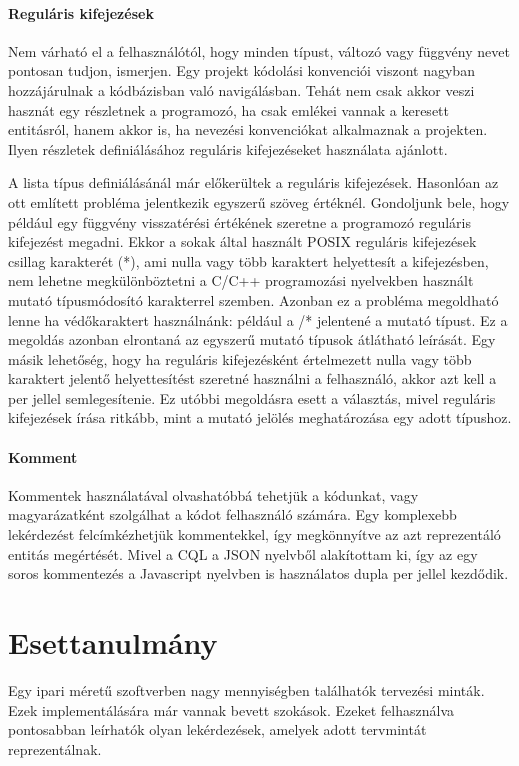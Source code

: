 \documentclass[a4paper,12pt]{report}
\begin{document}
\subsubsection{Reguláris kifejezések}
Nem várható el a felhasználótól, hogy minden típust, változó vagy függvény nevet pontosan tudjon, ismerjen. Egy projekt kódolási konvenciói viszont nagyban hozzájárulnak a kódbázisban való navigálásban. Tehát nem csak akkor veszi hasznát egy részletnek a programozó, ha csak emlékei vannak a keresett entitásról, hanem akkor is, ha nevezési konvenciókat alkalmaznak a projekten. Ilyen részletek definiálásához reguláris kifejezéseket használata ajánlott.
\par A lista típus definiálásánál már előkerültek a reguláris kifejezések. Hasonlóan az ott említett probléma jelentkezik egyszerű szöveg értéknél. Gondoljunk bele, hogy például egy függvény visszatérési értékének szeretne a programozó reguláris kifejezést megadni. Ekkor a sokak által használt POSIX reguláris kifejezések csillag karakterét (*), ami nulla vagy több karaktert helyettesít a kifejezésben, nem lehetne megkülönböztetni a C/C++ programozási nyelvekben használt mutató típusmódosító karakterrel szemben. Azonban ez a probléma megoldható lenne ha védőkaraktert használnánk: például a /* jelentené a mutató típust. Ez a megoldás azonban elrontaná az egyszerű mutató típusok átlátható leírását. Egy másik lehetőség, hogy ha reguláris kifejezésként értelmezett nulla vagy több karaktert jelentő helyettesítést szeretné használni a felhasználó, akkor azt kell a per jellel semlegesítenie. Ez utóbbi megoldásra esett a választás, mivel reguláris kifejezések írása ritkább, mint a mutató jelölés meghatározása egy adott típushoz.
\subsubsection{Komment}
Kommentek használatával olvashatóbbá tehetjük a kódunkat, vagy magyarázatként szolgálhat a kódot felhasználó számára. Egy komplexebb lekérdezést felcímkézhetjük kommentekkel, így megkönnyítve az azt reprezentáló entitás megértését. Mivel a CQL a JSON nyelvből alakítottam ki, így az egy soros kommentezés a Javascript nyelvben is használatos dupla per jellel kezdődik.

\chapter{Esettanulmány}
Egy ipari méretű szoftverben nagy mennyiségben találhatók tervezési minták. Ezek implementálására már vannak bevett szokások. Ezeket felhasználva pontosabban leírhatók olyan lekérdezések, amelyek adott tervmintát reprezentálnak.
\end{document}
